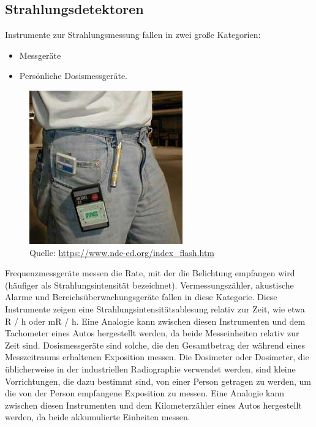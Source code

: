 {\subsection{Strahlungsdetektoren}
Instrumente zur Strahlungsmessung fallen in zwei große Kategorien:
\begin{itemize}
\item Messgeräte 
\item Persönliche Dosismessgeräte. 
\end{itemize}
\begin{figure}
\includegraphics[scale=0.5]{img/strahlungsdetektor.jpg}\\
Quelle: \url{https://www.nde-ed.org/index_flash.htm}
\end{figure}
Frequenzmessgeräte messen die Rate, mit der die Belichtung empfangen wird 
(häufiger als Strahlungsintensität bezeichnet).
Vermessungszähler, akustische Alarme und Bereichsüberwachungsgeräte fallen in diese Kategorie. Diese Instrumente zeigen eine Strahlungsintensitätsablesung relativ zur Zeit, wie etwa R / h oder mR / h. Eine Analogie kann zwischen diesen Instrumenten und dem Tachometer eines Autos hergestellt werden, da beide Messeinheiten relativ zur Zeit sind.
Dosismessgeräte sind solche, die den Gesamtbetrag der während eines Messzeitraums erhaltenen Exposition messen. Die Dosimeter oder Dosimeter, die üblicherweise in der industriellen Radiographie verwendet werden, sind kleine Vorrichtungen, die dazu bestimmt sind, von einer Person getragen zu werden, um die von der Person empfangene Exposition zu messen. Eine Analogie kann zwischen diesen Instrumenten und dem Kilometerzähler eines Autos hergestellt werden, da beide akkumulierte Einheiten messen.

}

